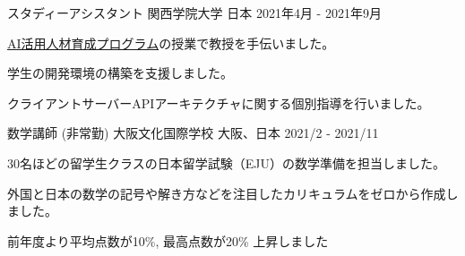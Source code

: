 \begin{cventries}
\cventry
  {スタディーアシスタント} %
  {関西学院大学} %
  {日本} %
  {2021年4月 - 2021年9月} %
  {
    \begin{cvjobdesc} %
      \href{https://www.kwansei.ac.jp/education/ai}{AI活用人材育成プログラム}の授業で教授を手伝いました。
      \vspace{2.0mm}
      \begin{cvbullets}
        \item {学生の開発環境の構築を支援しました。}
        \item {クライアントサーバーAPIアーキテクチャに関する個別指導を行いました。}
      \end{cvbullets}
    \end{cvjobdesc}
  }

  \cventry
    {数学講師 (非常勤)} %
    {大阪文化国際学校} %
    {大阪、日本} %
    {2021/2 - 2021/11} %
    {
      \begin{cvitems} %
        \item {30名ほどの留学生クラスの日本留学試験（EJU）の数学準備を担当しました。}
        \item {外国と日本の数学の記号や解き方などを注目したカリキュラムをゼロから作成しました。}
        \item {前年度より平均点数が10\%, 最高点数が20\% 上昇しました}
      \end{cvitems}
    }

\end{cventries}
